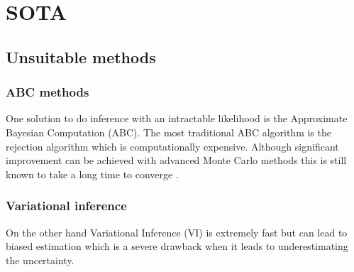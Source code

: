 
\chapter{SOTA}  %
\label{chap:sota}

\ifpdf
    \graphicspath{{Chapter2/Figs/Raster/}{Chapter2/Figs/PDF/}{Chapter2/Figs/}}
\else
    \graphicspath{{Chapter2/Figs/Vector/}{Chapter2/Figs/}}
\fi

\section{Unsuitable methods} %
\label{sec:unsuitable_methods}


\subsection{ABC methods} %
\label{sub:abc_methods}



One solution to do inference with an intractable likelihood is the Approximate Bayesian Computation (ABC).
The most traditional ABC algorithm is the rejection algorithm which is computationally expensive.
Although significant improvement can be achieved with advanced Monte Carlo methods this is still known to take a long time to converge \needcite.


\subsection{Variational inference} %
\label{sub:variational_inference}


On the other hand Variational Inference (VI) is extremely fast but can lead to biased estimation which is a severe drawback when it leads to underestimating the uncertainty.

